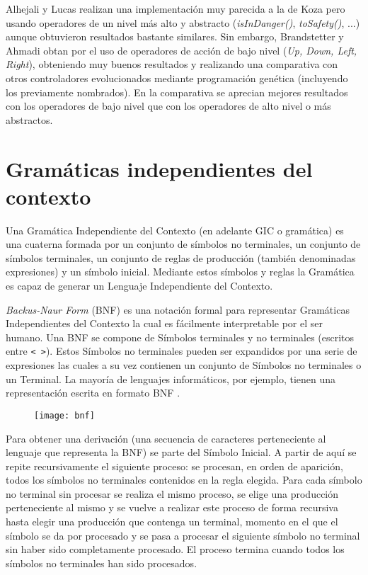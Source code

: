Alhejali y Lucas \cite{alhejali2010evolving} realizan una implementación muy parecida a la de Koza pero usando operadores de un nivel más alto y abstracto (\textit{isInDanger()}, \textit{toSafety()}, ...) aunque obtuvieron resultados bastante similares. Sin embargo, Brandstetter y Ahmadi \cite{brandstetter2012reactive} obtan por el uso de operadores de acción de bajo nivel (\textit{Up, Down, Left, Right}), obteniendo muy buenos resultados y realizando una comparativa con otros controladores evolucionados mediante programación genética (incluyendo los previamente nombrados). En la comparativa se aprecian mejores resultados con los operadores de bajo nivel que con los operadores de alto nivel o más abstractos.

\section{Gramáticas independientes del contexto}
Una Gramática Independiente del Contexto (en adelante GIC o gramática) es una cuaterna formada por un conjunto de símbolos no terminales, un conjunto de símbolos terminales, un conjunto de reglas de producción (también denominadas expresiones) y un símbolo inicial. Mediante estos símbolos y reglas la Gramática es capaz de generar un Lenguaje Independiente del Contexto\cite{hopcroft_motwani_ullman_2007}\cite{HolgerApuntes}.

\textit{Backus-Naur Form} (BNF) es una notación formal para representar Gramáticas Independientes del Contexto la cual es fácilmente interpretable por el ser humano. Una BNF se compone de Símbolos terminales y no terminales (escritos entre \texttt{< >}). Estos Símbolos no terminales pueden ser expandidos por una serie de expresiones las cuales a su vez contienen un conjunto de Símbolos no terminales o un Terminal. La mayoría de lenguajes informáticos, por ejemplo, tienen una representación escrita en formato BNF \cite{garshol2003bnf}.

\begin{figure}[H]
\centering
\texttt{[image: bnf]}
\end{figure}

Para obtener una derivación (una secuencia de caracteres perteneciente al lenguaje que representa la BNF) se parte del Símbolo Inicial. A partir de aquí se repite recursivamente el siguiente proceso: se procesan, en orden de aparición, todos los símbolos no terminales contenidos en la regla elegida. Para cada símbolo no terminal sin procesar se realiza el mismo proceso, se elige una producción perteneciente al mismo y se vuelve a realizar este proceso de forma recursiva hasta elegir una producción que contenga un terminal, momento en el que el símbolo se da por procesado y se pasa a procesar el siguiente símbolo no terminal sin haber sido completamente procesado. El proceso termina cuando todos los símbolos no terminales han sido procesados.

